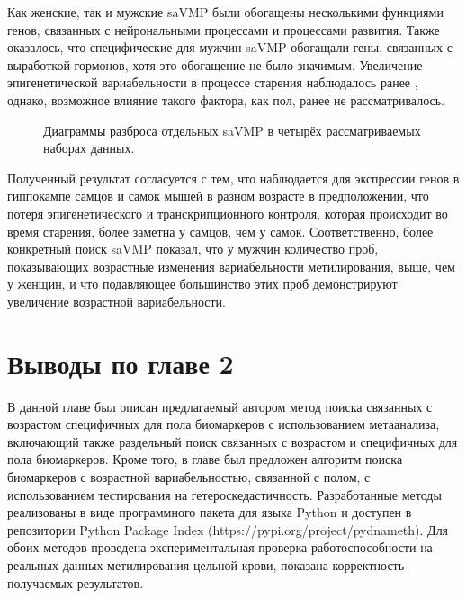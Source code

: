 Как женские, так и мужские saVMP были обогащены несколькими функциями генов, связанных с нейрональными процессами и процессами развития. Также оказалось, что специфические для мужчин saVMP обогащали гены, связанных с выработкой гормонов, хотя это обогащение не было значимым. Увеличение эпигенетической вариабельности в процессе старения наблюдалось ранее \autocite{Slieker2016}, однако, возможное влияние такого фактора, как пол, ранее не рассматривалось. 

\begin{figure}[ht]
	\caption{Диаграммы разброса отдельных saVMP в четырёх рассматриваемых наборах данных.}\label{fig:saVMP}
\end{figure}

Полученный результат согласуется с тем, что наблюдается для экспрессии генов в гиппокампе самцов и самок мышей в разном возрасте \autocite{Mangold2017} в предположении, что потеря эпигенетического и транскрипционного контроля, которая происходит во время старения, более заметна у самцов, чем у самок. Соответственно, более конкретный поиск saVMP показал, что у мужчин количество проб, показывающих возрастные изменения вариабельности метилирования, выше, чем у женщин, и что подавляющее большинство этих проб демонстрируют увеличение возрастной вариабельности.

\section*{Выводы по главе 2} \label{sec:ch2/conclusion}                       

В данной главе был описан предлагаемый автором метод поиска связанных с возрастом специфичных для пола биомаркеров с использованием метаанализа, включающий также раздельный поиск связанных с возрастом и специфичных для пола биомаркеров. Кроме того, в главе был предложен алгоритм поиска биомаркеров с возрастной вариабельностью, связанной с полом, с использованием тестирования на гетероскедастичность. Разработанные методы реализованы в виде программного пакета для языка Python и доступен в репозитории Python Package Index (https://pypi.org/project/pydnameth). Для обоих методов проведена экспериментальная проверка работоспособности на реальных данных метилирования цельной крови, показана корректность получаемых результатов.

\FloatBarrier
